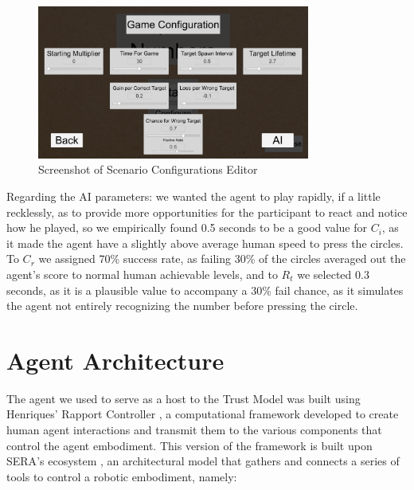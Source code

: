 \begin{figure}[hbt]
    \centering
    \includegraphics[width=0.8\textwidth]{figures/GameConfigs.png}
    \caption{Screenshot of Scenario Configurations Editor}
    \label{fig:ScenarioConfigs}
\end{figure}

Regarding the \ac{AI} parameters: we wanted the agent to play rapidly, if a little recklessly, as to provide more opportunities for the participant to react and notice how he played, so we empirically found 0.5 seconds to be a good value for $C_i$, as it made the agent have a slightly above average human speed to press the circles. To $C_r$ we assigned 70\% success rate, as failing 30\% of the circles averaged out the agent's score to normal human achievable levels, and to $R_t$ we selected 0.3 seconds, as it is a plausible value to accompany a 30\% fail chance, as it simulates the agent not entirely recognizing the number before pressing the circle.



\section{Agent Architecture}
The agent we used to serve as a host to the Trust Model was built using Henriques' Rapport Controller \cite{Henriques2016}, a computational framework developed to create human agent interactions and transmit them to the various components that control the agent embodiment. This version of the framework is built upon \ac{SERA}'s ecosystem \cite{Ribeiro2003}, an architectural model that gathers and connects a series of tools to control a robotic embodiment, namely:

